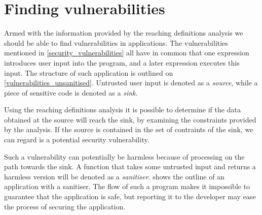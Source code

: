 \section{Finding vulnerabilities}
Armed with the information provided by the reaching definitions analysis we should be able to find vulnerabilities in applications.
The vulnerabilities mentioned in \cref{security_vulnerabilities} all have in common that one expression introduces user input into the program, and a later expression executes this input.
The structure of such application is outlined on \cref{vulnerabilities_unsanitised}.
Untrusted user input is denoted as a \emph{source}, while a piece of sensitive code is denoted as a \emph{sink}.

Using the reaching definitions analysis it is possible to determine if the data obtained at the source will reach the sink, by examining the constraints provided by the analysis.
If the source is contained in the set of contraints of the sink, we can regard is a potential security vulnerability.

Such a vulnerability can potentially be harmless because of processing on the path towards the sink.
A function that takes some untrusted input and returns a harmless version will be denoted as a \emph{sanitiser}.
 shows the outline of an application with a sanitiser.
The flow of such a program makes it impossible to guarantee that the application is safe, but reporting it to the developer may ease the process of securing the application.



